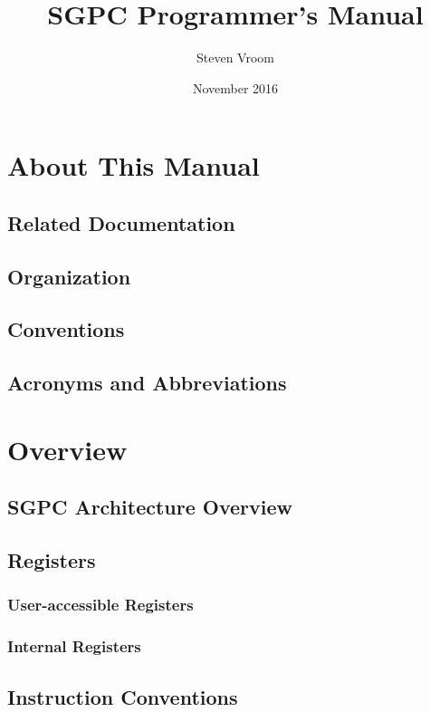 \documentclass[oneside, a4paper]{memoir}
\begin{document}
\title{SGPC Programmer's Manual}
\author{Steven Vroom}
\date{November 2016}
\maketitle
\cleardoublepage

\setlength\arrayrulewidth{1pt}

\frontmatter
\setcounter{tocdepth}{2}
\tableofcontents
\cleardoublepage
\listoffigures
\cleardoublepage
\listoftables
\cleardoublepage

\chapter{About This Manual}
\section{Related Documentation}
\section{Organization}
\section{Conventions}
\section{Acronyms and Abbreviations}

\mainmatter
\chapter{Overview}
\section{SGPC Architecture Overview}
\section{Registers}
\subsection{User-accessible Registers}
\subsection{Internal Registers}
\section{Instruction Conventions}
\end{document}

